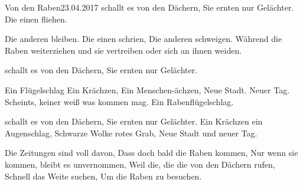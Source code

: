 \begin{poem}{Von den Raben}{23.04.2017}
schallt es von den Dächern,
Sie ernten nur Gelächter.
Die einen fliehen.

Die anderen bleiben.
Die einen schrien,
Die anderen schweigen.
Während die Raben weiterziehen
und sie vertreiben
oder sich an ihnen weiden.

schallt es von den Dächern,
Sie ernten nur Gelächter.

Ein Flügelschlag
Ein Krächzen,
Ein Menschen-ächzen,
Neue Stadt. Neuer Tag.
Scheints, keiner weiß was kommen mag.
Ein Rabenflügelschlag.

schallt es von den Dächern,
Sie ernten nur Gelächter.
Ein Krächzen ein Augenschlag,
Schwarze Wolke rotes Grab,
Neue Stadt und neuer Tag.

Die Zeitungen sind voll davon,
Dass doch bald die Raben kommen,
Nur wenn sie kommen,
bleibt es unvernommen,
Weil die, die die von den Dächern rufen,
Schnell das Weite suchen,
Um die Raben zu besuchen.
\end{poem}